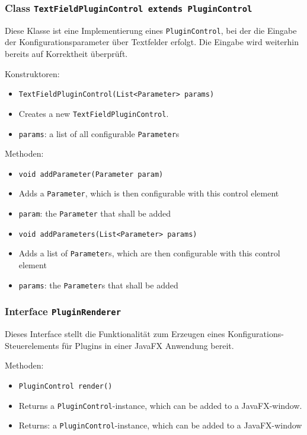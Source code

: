 \documentclass[parskip=full,11pt]{scrartcl}
\begin{document}
\subsubsection{Class \texttt{TextFieldPluginControl extends PluginControl}}

Diese Klasse ist eine Implementierung eines  \texttt{PluginControl}, bei der die Eingabe der Konfigurationsparameter über Textfelder erfolgt. Die Eingabe wird weiterhin bereits auf Korrektheit überprüft.

Konstruktoren:

\begin{itemize}\itemsep -10pt
	\item \texttt{TextFieldPluginControl(List<Parameter> params)}
	\item[] Creates a new \texttt{TextFieldPluginControl}.
	\item[] \texttt{params}: a list of all configurable \texttt{Parameter}s
\end{itemize}

Methoden:

\begin{itemize}\itemsep -10pt
	\item \texttt{void addParameter(Parameter param)}
	\item[] Adds a \texttt{Parameter}, which is then configurable with this control element
	\item[] \texttt{param}: the \texttt{Parameter} that shall be added
	\item \texttt{void addParameters(List<Parameter> params)}
	\item[] Adds a list of \texttt{Parameter}s, which are then configurable with this control element
	\item[] \texttt{params}: the \texttt{Parameter}s that shall be added
\end{itemize}

\subsubsection{Interface \texttt{PluginRenderer}}

Dieses Interface stellt die Funktionalität zum Erzeugen eines Konfigurations-Steuerelements für Plugins in einer JavaFX Anwendung bereit.

Methoden:

\begin{itemize}\itemsep -10pt
	\item \texttt{PluginControl render()}
	\item[] Returns a \texttt{PluginControl}-instance, which can be added to a JavaFX-window.
	\item[] Returns: a \texttt{PluginControl}-instance, which can be added to a JavaFX-window
\end{itemize}
\end{document}
